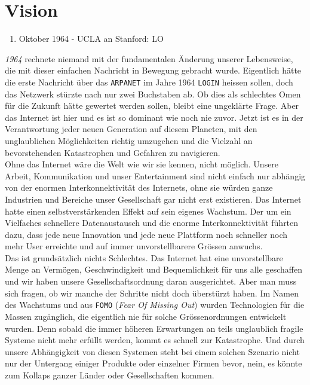 \documentclass[a4paper,11pt,titlepage,twoside]{memoir}
\begin{document}
\chapter{Vision}
\label{sec:orge53a6d1}
\begin{center}
\begin{enumerate}
\item Oktober 1964 - UCLA an Stanford: LO
\end{enumerate}
\end{center}
\emph{1964} rechnete niemand mit der fundamentalen Änderung unserer
Lebensweise, die mit dieser einfachen Nachricht in Bewegung gebracht
wurde. Eigentlich hätte die erste Nachricht über das \texttt{ARPANET} im Jahre
1964 \texttt{LOGIN} heissen sollen, doch das Netzwerk stürzte nach nur zwei
Buchstaben ab. Ob dies als schlechtes Omen für die Zukunft hätte
gewertet werden sollen, bleibt eine ungeklärte Frage. Aber das
Internet ist hier und es ist so dominant wie noch nie zuvor. Jetzt ist
es in der Verantwortung jeder neuen Generation auf diesem Planeten,
mit den unglaublichen Möglichkeiten richtig umzugehen und die Vielzahl
an bevorstehenden Katastrophen und Gefahren zu navigieren.\\

\noindent Ohne das Internet wäre die Welt wie wir sie kennen, nicht
möglich. Unsere Arbeit, Kommunikation und unser Entertainment sind
nicht einfach nur abhängig von der enormen Interkonnektivität des
Internets, ohne sie würden ganze Industrien und Bereiche unser
Gesellschaft gar nicht erst existieren. Das Internet hatte einen
selbstverstärkenden Effekt auf sein eigenes Wachstum. Der um ein
Vielfaches schnellere Datenaustausch und die enorme Interkonnektivität
führten dazu, dass jede neue Innovation und jede neue Plattform noch
schneller noch mehr User erreichte und auf immer unvorstellbarere
Grössen anwuchs.\\

\noindent Das ist grundsätzlich nichts Schlechtes. Das Internet hat
eine unvorstellbare Menge an Vermögen, Geschwindigkeit und
Bequemlichkeit für uns alle geschaffen und wir haben unsere
Gesellschaftsordnung daran ausgerichtet. Aber man muss sich fragen, ob
wir manche der Schritte nicht doch überstürzt haben. Im Namen des
Wachstums und aus \texttt{FOMO} (\emph{Fear Of Missing Out}) wurden Technologien für
die Massen zugänglich, die eigentlich nie für solche Grössenordnungen
entwickelt wurden. Denn sobald die immer höheren Erwartungen an teils
unglaublich fragile Systeme nicht mehr erfüllt werden, kommt es
schnell zur Katastrophe. Und durch unsere Abhängigkeit von diesen
Systemen steht bei einem solchen Szenario nicht nur der Untergang
einiger Produkte oder einzelner Firmen bevor, nein, es könnte zum
Kollaps ganzer Länder oder Gesellschaften kommen.\\
\end{document}

